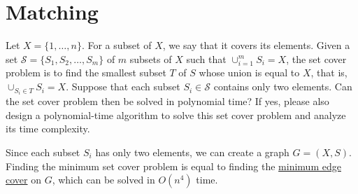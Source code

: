 \section{Matching}
\begin{Exercise}[title={Edge cover problem},origin={NTHU CSIE 101}]
Let $X = \{1, \dots, n\}$. For a subset of $X$, we say that it covers its elements. Given a set $\mathcal{S} = \{ S_1, S_2, \dots, S_m\}$ of $m$ subsets of $X$ such that $\cup_{i=1}^m S_i = X$, the set cover problem is to find the smallest subset $T$ of $S$ whose union is equal to $X$, that is, $\cup_{S_i \in T} S_i = X$. Suppose that each subset $S_i \in \mathcal{S}$ contains only two elements. Can the set cover problem then be solved in polynomial time? If yes, please also design a polynomial-time algorithm to solve this set cover problem and analyze its time complexity. 
\end{Exercise}
\begin{Answer}
Since each subset $S_i$ has only two elements, we can create a graph $G = (X, S)$.
Finding the minimum set cover problem is equal to finding the \href{https://en.wikipedia.org/wiki/Edge_cover}{minimum edge cover} on $G$, which can be solved in $O(n^4)$ time.
\end{Answer}

